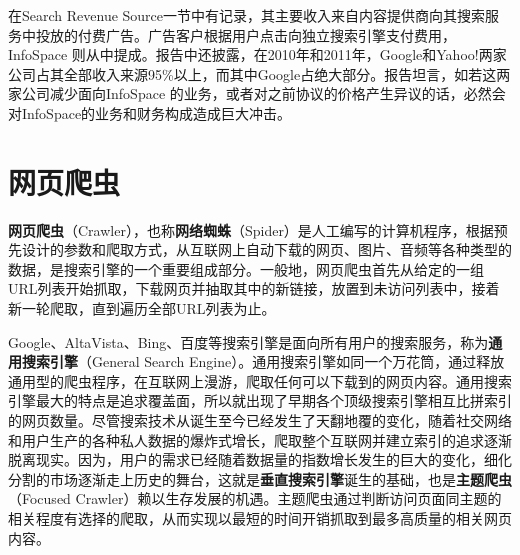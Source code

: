在Search Revenue Source一节中有记录，其主要收入来自内容提供商向其搜索服务中投放的付费广告。广告客户根据用户点击向独立搜索引擎支付费用，InfoSpace 则从中提成。报告中还披露，在2010年和2011年，Google和Yahoo!两家公司占其全部收入来源95\%以上，而其中Google占绝大部分。报告坦言，如若这两家公司减少面向InfoSpace 的业务，或者对之前协议的价格产生异议的话，必然会对InfoSpace的业务和财务构成造成巨大冲击。


\section{网页爬虫}
\textbf{网页爬虫}（Crawler），也称\textbf{网络蜘蛛}（Spider）是人工编写的计算机程序，根据预先设计的参数和爬取方式，从互联网上自动下载的网页、图片、音频等各种类型的数据，是搜索引擎的一个重要组成部分。一般地，网页爬虫首先从给定的一组URL列表开始抓取，下载网页并抽取其中的新链接，放置到未访问列表中，接着新一轮爬取，直到遍历全部URL列表为止。

Google、AltaVista、Bing、百度等搜索引擎是面向所有用户的搜索服务，称为\textbf{通用搜索引擎}（General Search Engine）。通用搜索引擎如同一个万花筒，通过释放通用型的爬虫程序，在互联网上漫游，爬取任何可以下载到的网页内容。通用搜索引擎最大的特点是追求覆盖面，所以就出现了早期各个顶级搜索引擎相互比拼索引的网页数量。尽管搜索技术从诞生至今已经发生了天翻地覆的变化，随着社交网络和用户生产的各种私人数据的爆炸式增长，爬取整个互联网并建立索引的追求逐渐脱离现实。因为，用户的需求已经随着数据量的指数增长发生的巨大的变化，细化分割的市场逐渐走上历史的舞台，这就是\textbf{垂直搜索引擎}诞生的基础，也是\textbf{主题爬虫}（Focused Crawler）赖以生存发展的机遇。主题爬虫通过判断访问页面同主题的相关程度有选择的爬取，从而实现以最短的时间开销抓取到最多高质量的相关网页内容。
